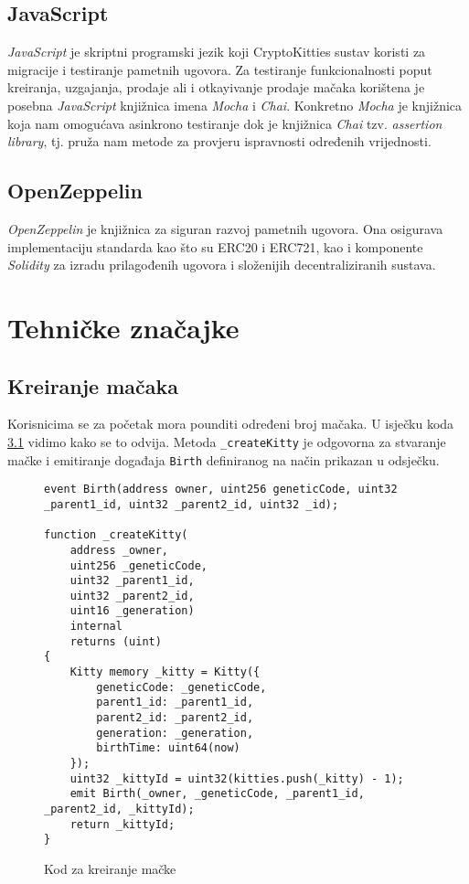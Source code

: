 \documentclass[times, utf8, tehnicka_dokumentacija]{fer}
\begin{document}
\section{JavaScript}
{\it JavaScript} je skriptni programski jezik koji CryptoKitties sustav koristi za migracije i testiranje pametnih
ugovora. Za testiranje funkcionalnosti poput kreiranja, uzgajanja, prodaje ali i otkayivanje prodaje mačaka korištena
je posebna {\it JavaScript} knjižnica imena {\it Mocha} i {\it Chai}. Konkretno {\it Mocha} je knjižnica koja nam
omogućava asinkrono testiranje dok je knjižnica {\it Chai} tzv. {\it assertion library}, tj. pruža nam metode za
provjeru ispravnosti određenih vrijednosti.

\section{OpenZeppelin}
{\it OpenZeppelin} je knjižnica za siguran razvoj pametnih ugovora. Ona osigurava implementaciju standarda kao što su
ERC20 i ERC721, kao i komponente {\it Solidity} za izradu prilagođenih ugovora i složenijih decentraliziranih sustava.

\chapter{Tehničke značajke}

\section{Kreiranje mačaka}
Korisnicima se za početak mora pounditi određeni broj mačaka. U isječku koda \ref{lst:createkitty} vidimo kako se to
odvija. Metoda \lstinline|_createKitty| je odgovorna za stvaranje mačke i emitiranje događaja \lstinline|Birth|
definiranog na način prikazan u odsječku.

\begin{figure}
\begin{lstlisting}
event Birth(address owner, uint256 geneticCode, uint32 _parent1_id, uint32 _parent2_id, uint32 _id);

function _createKitty(
    address _owner,
    uint256 _geneticCode,
    uint32 _parent1_id,
    uint32 _parent2_id,
    uint16 _generation)
    internal
    returns (uint)
{
    Kitty memory _kitty = Kitty({
        geneticCode: _geneticCode,
        parent1_id: _parent1_id,
        parent2_id: _parent2_id,
        generation: _generation,
        birthTime: uint64(now)
    });
    uint32 _kittyId = uint32(kitties.push(_kitty) - 1);
    emit Birth(_owner, _geneticCode, _parent1_id, _parent2_id, _kittyId);
    return _kittyId;
}
\end{lstlisting}
\caption{Kod za kreiranje mačke}
\label{lst:createkitty}
\end{figure}
\end{document}
